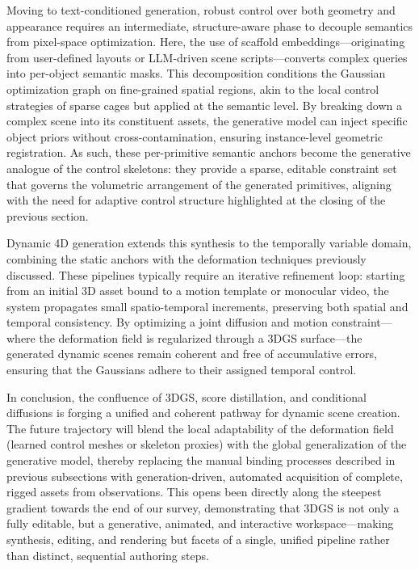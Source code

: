 \documentclass[11pt,a4paper]{article}
\begin{document}
Moving to text-conditioned generation, robust control over both geometry and appearance requires an intermediate, structure-aware phase to decouple semantics from pixel-space optimization. Here, the use of scaffold embeddings---originating from user-defined layouts or LLM-driven scene scripts---converts complex queries into per-object semantic masks. This decomposition conditions the Gaussian optimization graph on fine-grained spatial regions, akin to the local control strategies of sparse cages but applied at the semantic level. By breaking down a complex scene into its constituent assets, the generative model can inject specific object priors without cross-contamination, ensuring instance-level geometric registration. As such, these per-primitive semantic anchors become the generative analogue of the control skeletons: they provide a sparse, editable constraint set that governs the volumetric arrangement of the generated primitives, aligning with the need for adaptive control structure highlighted at the closing of the previous section.

Dynamic 4D generation extends this synthesis to the temporally variable domain, combining the static anchors with the deformation techniques previously discussed. These pipelines typically require an iterative refinement loop: starting from an initial 3D asset bound to a motion template or monocular video, the system propagates small spatio-temporal increments, preserving both spatial and temporal consistency. By optimizing a joint diffusion and motion constraint---where the deformation field is regularized through a 3DGS surface---the generated dynamic scenes remain coherent and free of accumulative errors, ensuring that the Gaussians adhere to their assigned temporal control.

In conclusion, the confluence of 3DGS, score distillation, and conditional diffusions is forging a unified and coherent pathway for dynamic scene creation. The future trajectory will blend the local adaptability of the deformation field (learned control meshes or skeleton proxies) with the global generalization of the generative model, thereby replacing the manual binding processes described in previous subsections with generation-driven, automated acquisition of complete, rigged assets from observations. This opens been directly along the steepest gradient towards the end of our survey, demonstrating that 3DGS is not only a fully editable, but a generative, animated, and interactive workspace---making synthesis, editing, and rendering but facets of a single, unified pipeline rather than distinct, sequential authoring steps.
\end{document}
